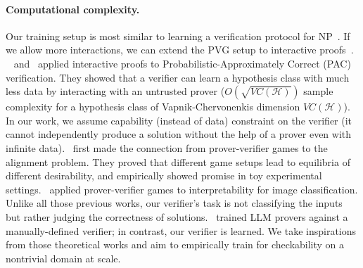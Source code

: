 \documentclass{article}
\begin{document}
\paragraph{Computational complexity.} Our training setup is most similar to learning a verification protocol for NP~\citep{micali2000computationally}. If we allow more interactions, we can extend the PVG setup to interactive proofs~\citep{babai1985trading,goldwasser2019knowledge}.
~\citet{goldwasser2021interactive} and~\citet{pmlr-v195-mutreja23a} applied interactive proofs to Probabilistic-Approximately Correct (PAC) verification. They showed that a verifier can learn a hypothesis class with much less data by interacting with an untrusted prover ($O(\sqrt{VC(\mathcal{H})})$ sample complexity for a hypothesis class of Vapnik-Chervonenkis dimension $VC(\mathcal{H})$). In our work, we assume capability (instead of data) constraint on the verifier (it cannot independently produce a solution without the help of a prover even with infinite data).~\citet{anil2021learning} first made the connection from prover-verifier games to the alignment problem. They proved that different game setups lead to equilibria of different desirability, and empirically showed promise in toy experimental settings.~\citet{waldchen2024interpretability} applied prover-verifier games to interpretability for image classification. Unlike all those previous works, our verifier's task is not classifying the inputs but rather judging the correctness of solutions.~\citet{amit2024models} trained LLM provers against a manually-defined verifier; in contrast, our verifier is learned. We take inspirations from those theoretical works and aim to empirically train for checkability on a nontrivial domain at scale.
\end{document}
